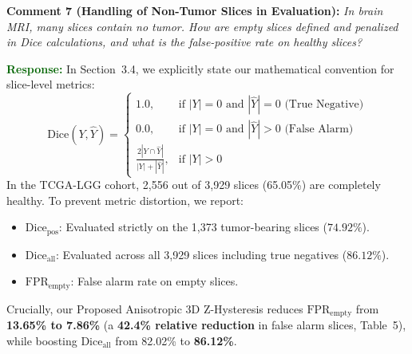\documentclass[11pt]{article}
\newcommand{\commentbox}[2]{%
\vspace{0.42em}\noindent
\textbf{\textcolor{NavyBlue}{#1:}} \textit{#2}\vspace{0.18em}%
}
\newcommand{\responsebox}[1]{%
\noindent
\textbf{\textcolor{DarkGreen}{Response:}} #1\vspace{0.42em}%
}
\begin{document}
\commentbox{Comment 7 (Handling of Non-Tumor Slices in Evaluation)}{In brain MRI, many slices contain no tumor. How are empty slices defined and penalized in Dice calculations, and what is the false-positive rate on healthy slices?}
\responsebox{In Section~3.4, we explicitly state our mathematical convention for slice-level metrics:
\begin{equation}
\text{Dice}(Y, \hat{Y}) = \begin{cases}
1.0, & \text{if } |Y| = 0 \text{ and } |\hat{Y}| = 0 \text{ (True Negative)} \\
0.0, & \text{if } |Y| = 0 \text{ and } |\hat{Y}| > 0 \text{ (False Alarm)} \\
\frac{2|Y \cap \hat{Y}|}{|Y| + |\hat{Y}|}, & \text{if } |Y| > 0
\end{cases}
\end{equation}
In the TCGA-LGG cohort, 2,556 out of 3,929 slices (65.05\%) are completely healthy. To prevent metric distortion, we report:
\begin{itemize}
    \item $\text{Dice}_{\text{pos}}$: Evaluated strictly on the 1,373 tumor-bearing slices ($74.92\%$).
    \item $\text{Dice}_{\text{all}}$: Evaluated across all 3,929 slices including true negatives ($86.12\%$).
    \item $\text{FPR}_{\text{empty}}$: False alarm rate on empty slices.
\end{itemize}
Crucially, our Proposed Anisotropic 3D Z-Hysteresis reduces $\text{FPR}_{\text{empty}}$ from \textbf{13.65\% to 7.86\%} (a \textbf{42.4\% relative reduction} in false alarm slices, Table~5), while boosting $\text{Dice}_{\text{all}}$ from 82.02\% to \textbf{86.12\%}.}
\end{document}
